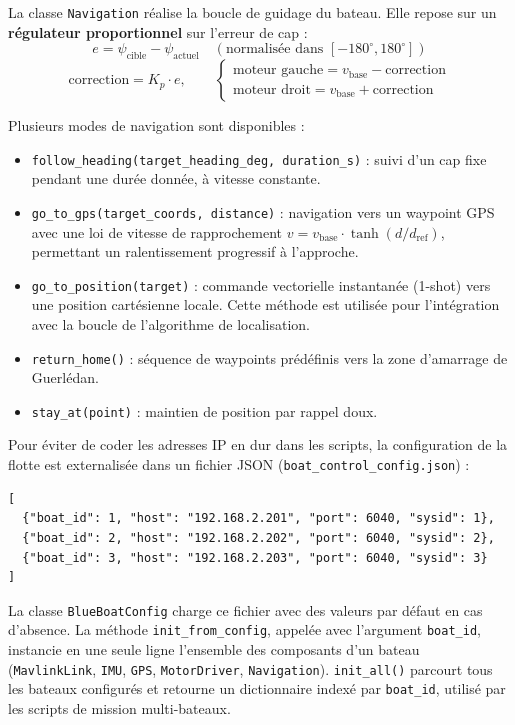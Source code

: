 \label{sec:bblib:navigation}
La classe \texttt{Navigation} réalise la boucle de guidage du bateau. Elle repose sur un \textbf{régulateur proportionnel} sur l'erreur de cap :
\[
  e = \psi_{\text{cible}} - \psi_{\text{actuel}} \quad (\text{normalisée dans } {[-180^\circ, 180^\circ]})
\]
\[
  \text{correction} = K_p \cdot e, \qquad \begin{cases} \text{moteur gauche} = v_{\text{base}} - \text{correction} \\ \text{moteur droit} = v_{\text{base}} + \text{correction} \end{cases}
\]

Plusieurs modes de navigation sont disponibles :

\begin{itemize}
  \item \texttt{follow\_heading(target\_heading\_deg, duration\_s)} : suivi d'un cap fixe pendant une durée donnée, à vitesse constante.
  \item \texttt{go\_to\_gps(target\_coords, distance)} : navigation vers un waypoint GPS avec une loi de vitesse de rapprochement $v = v_{\text{base}} \cdot \tanh(d / d_{\text{ref}})$, permettant un ralentissement progressif à l'approche.
  \item \texttt{go\_to\_position(target)} : commande vectorielle instantanée (1-shot) vers une position cartésienne locale. Cette méthode est utilisée pour l'intégration avec la boucle de l'algorithme de localisation.
  \item \texttt{return\_home()} : séquence de waypoints prédéfinis vers la zone d'amarrage de Guerlédan.
  \item \texttt{stay\_at(point)} : maintien de position par rappel doux.
\end{itemize}

Pour éviter de coder les adresses IP en dur dans les scripts, la configuration de la flotte est externalisée dans un fichier JSON (\texttt{boat\_control\_config.json}) :

\begin{lstlisting}[style=python, caption={Exemple de fichier de configuration de la flotte (\texttt{boat\_control\_config.json}).}]
[
  {"boat_id": 1, "host": "192.168.2.201", "port": 6040, "sysid": 1},
  {"boat_id": 2, "host": "192.168.2.202", "port": 6040, "sysid": 2},
  {"boat_id": 3, "host": "192.168.2.203", "port": 6040, "sysid": 3}
]
\end{lstlisting}

La classe \texttt{BlueBoatConfig} charge ce fichier avec des valeurs par défaut en cas d'absence. La méthode \texttt{init\_from\_config}, appelée avec l'argument \texttt{boat\_id}, instancie en une seule ligne l'ensemble des composants d'un bateau (\texttt{MavlinkLink}, \texttt{IMU}, \texttt{GPS}, \texttt{MotorDriver}, \texttt{Navigation}). \texttt{init\_all()} parcourt tous les bateaux configurés et retourne un dictionnaire indexé par \texttt{boat\_id}, utilisé par les scripts de mission multi-bateaux.

